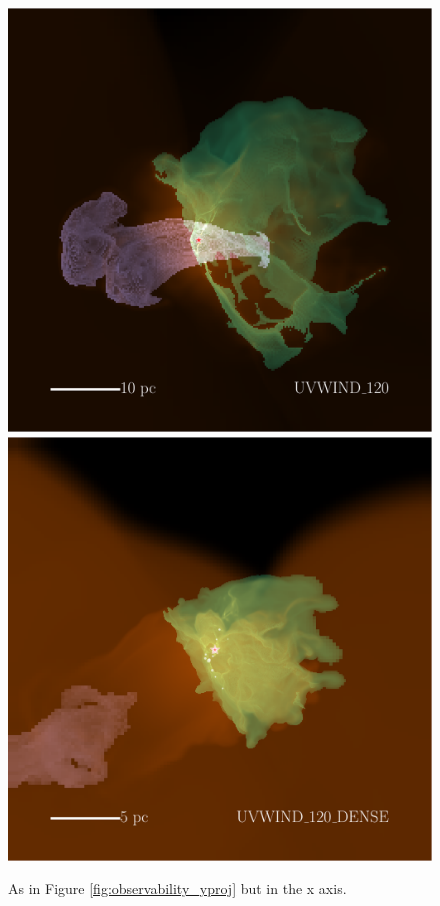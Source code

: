 \documentclass[a4paper,fleqn,usenatbib]{mnras}
\begin{document}
\begin{figure}
	\includegraphics[width=1\columnwidth]{plots/fig12c.pdf} \includegraphics[width=1\columnwidth]{plots/fig12d.pdf}
	\caption{As in Figure \ref{fig:observability_yproj} but in the x axis.}
	\label{fig:observability_xproj}
\end{figure}
\end{document}
